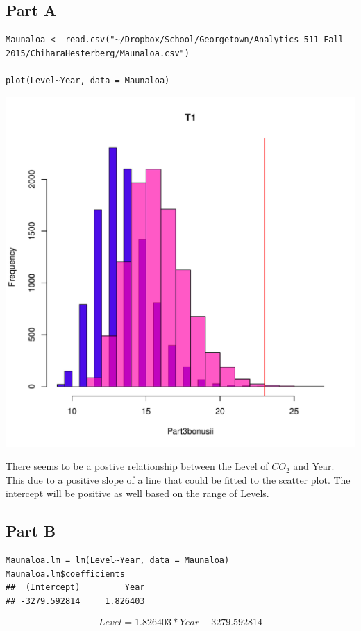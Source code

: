 \documentclass{article}\usepackage[]{graphicx}\usepackage[]{color}
\makeatletter
\newenvironment{kframe}{%
 \def\at@end@of@kframe{}%
 \ifinner\ifhmode%
  \def\at@end@of@kframe{\end{minipage}}%
  \begin{minipage}{\columnwidth}%
 \fi\fi%
 \def\FrameCommand##1{\hskip\@totalleftmargin \hskip-\fboxsep
 \colorbox{shadecolor}{##1}\hskip-\fboxsep
     \hskip-\linewidth \hskip-\@totalleftmargin \hskip\columnwidth}%
 \MakeFramed {\advance\hsize-\width
   \@totalleftmargin\z@ \linewidth\hsize
   \@setminipage}}%
 {\par\unskip\endMakeFramed%
 \at@end@of@kframe}
\newenvironment{knitrout}{}{} %
\makeatother
\begin{document}
\subsection*{Part A}
\begin{knitrout}
\color{fgcolor}\begin{kframe}
\begin{verbatim}
Maunaloa <- read.csv("~/Dropbox/School/Georgetown/Analytics 511 Fall 2015/ChiharaHesterberg/Maunaloa.csv")

plot(Level~Year, data = Maunaloa)
\end{verbatim}
\end{kframe}
\includegraphics[width=0.33\linewidth]{figure/unnamed-chunk-11-1} 

\end{knitrout}
There seems to be a postive relationship between the Level of $CO_{2}$ and Year. This due to a positive slope of a line that could be fitted to the scatter plot. The intercept will be positive as well based on the range of Levels.
\subsection*{Part B}
\begin{knitrout}
\color{fgcolor}\begin{kframe}
\begin{verbatim}
Maunaloa.lm = lm(Level~Year, data = Maunaloa)
Maunaloa.lm$coefficients
##  (Intercept)         Year 
## -3279.592814     1.826403
\end{verbatim}
\end{kframe}
\end{knitrout}
\begin{equation}
Level = 1.826403*Year-3279.592814
\end{equation}
\end{document}
